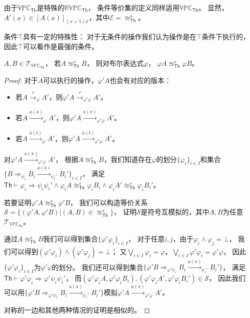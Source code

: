    由于$\mathbb{VPC}_{\mathsf{Th}}$是特殊的$\mathbb{RVPC}_{\mathsf{Th}}$，
   条件等价集的定义同样适用$\mathbb{VPC}_{\mathsf{Th}}$。
   显然，$A'(x)\in [A(x)]_{(x>5)\mathcal{E}}$，其中$\mathcal{E}=\approxeq_{\mathsf{Th}}^s$。
   
   条件$\top$具有一定的特殊性：
   对于无条件的操作我们认为操作是在$\top$条件下执行的，
   因此$\top$可以看作是最强的条件。
   \begin{corollary}\label{co:condition0}
      $A,B\in \mathcal{T}_{\mathbb{VPC}_{\mathsf{Th}}}$，
      若$A\approxeq_{\mathsf{Th}}^s B$，
      则对布尔表达式$\varphi$，
      $\varphi A\approxeq_{\mathsf{Th}}^s\varphi B$。
   \end{corollary}
   \begin{proof}
      对于$A$可以执行的操作，$\varphi' A$也会有对应的版本：
      \begin{itemize}
         \item 若$A\stackrel{\tau}{\rightarrow}_{\varphi} A'$，则$\varphi' A\stackrel{\tau}{\rightarrow}_{\varphi' \varphi}A'$。
         \item 若$A\stackrel{a(x)}{\rightarrow}_{\varphi} A'$，则$\varphi' A\stackrel{a(x)}{\rightarrow}_{\varphi' \varphi} A'$。
         \item 若$A\stackrel{\overline{a}(t)}{\rightarrow}_{\varphi} A'$，则$\varphi' A\stackrel{\overline{a}(t)}{\rightarrow}_{\varphi' \varphi} A'$。
      \end{itemize}
      对$\varphi' A\stackrel{a(x)}{\rightarrow}_{\varphi'\varphi} A'$，
      根据$A\approxeq_{\mathsf{Th}}^sB$，我们知道存在$\varphi$的划分$\{\varphi_i\}_{i\in I}$和集合$\{B\Rightarrow_{\psi_i}B_i\stackrel{a(x)}{\rightarrow}_{\psi_i'}B_i'\}_{i\in I}$，
      满足$\mathsf{Th}\vdash \varphi_i\Rightarrow \psi_i \psi_i' \wedge \varphi_i A\approxeq_{\mathsf{Th}}^s \varphi_i B_i \wedge \varphi_i A'\approxeq_{\mathsf{Th}}^s \varphi_i B_i'$。
      
      若要证明$\varphi' A\approxeq_{\mathsf{Th}}^s\varphi' B$，
      我们可以构造等价关系$\mathcal{S} = \{(\varphi'A,\varphi'B)|(A,B)\in \approxeq_{\mathsf{Th}}^s\}$，
      证明$\mathcal{S}$是符号互模拟的，其中$A,B$为任意$\mathcal{T}_{\mathbb{VPC}_{\mathsf{Th}}}$。

      通过$A\approxeq_{\mathsf{Th}}^sB$我们可以得到集合$\{\varphi'\varphi_i\}_{i\in I}$，
      对于任意$i,j$，由于$\varphi_i \wedge \varphi_j = \bot$，
      我们可以得到$(\varphi'\varphi_i) \wedge (\varphi'\varphi_j) = \bot$；
      又$\bigvee_{i\in I}\varphi_i = \varphi$，$\bigvee_{i\in I}\varphi'\varphi_i = \varphi'\varphi$，
      因此$\{\varphi'\varphi_i\}_{i\in I}$为$\varphi'\varphi$的划分。
      我们还可以得到集合$\{\varphi'B\Rightarrow_{\varphi'\psi_i}B_i\stackrel{a(x)}{\rightarrow}_{\psi_i'} B_i'\}$，
      满足$\mathsf{Th}\vdash \varphi'\varphi_i\Rightarrow \varphi'\psi_i\psi_i'$，
      而$(\varphi'\varphi_i A, \varphi'\varphi_i B_i),(\varphi'\varphi_i A', \varphi'\varphi_i B_i')\in \mathcal{S}$，
      因此我们可以用$\{\varphi'B\Rightarrow_{\varphi'\psi_i}B_i\stackrel{a(x)}{\rightarrow}_{\psi_i'} B_i'\}$模拟$\varphi' A\stackrel{a(x)}{\rightarrow}_{\varphi'\varphi} A'$。

      对称的一边和其他两种情况的证明是相似的。
   \end{proof}

